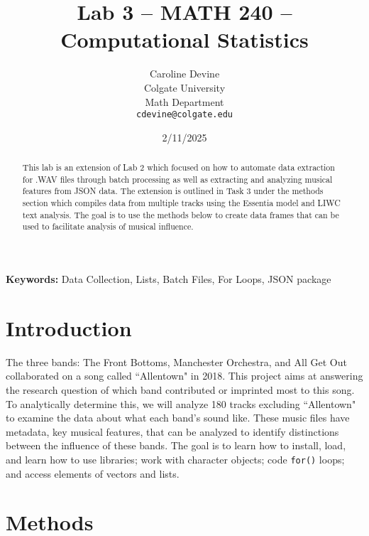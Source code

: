 \documentclass{article}\usepackage[]{graphicx}\usepackage[]{xcolor}
\begin{document}
\vspace{-1in}
\title{Lab 3 -- MATH 240 -- Computational Statistics}

\author{
  Caroline Devine \\
  Colgate University  \\
  Math Department  \\
  {\tt cdevine@colgate.edu}
}

\date{2/11/2025}

\maketitle

\begin{multicols}{2}
\begin{abstract}
This lab is an extension of Lab 2 which focused on how to automate data extraction for .WAV files through batch processing as well as extracting and analyzing musical features from JSON data. The extension is outlined in Task 3 under the methods section which compiles data from multiple tracks using the Essentia model and LIWC text analysis. The goal is to use the methods below to create data frames that can be used to facilitate analysis of musical influence.
\end{abstract}

\noindent \textbf{Keywords:} Data Collection, Lists, Batch Files, For Loops, JSON package

\section{Introduction}
The three bands: The Front Bottoms, Manchester Orchestra, and All Get Out collaborated on a song called ``Allentown"\citep{Ross} in 2018. This project aims at answering the research question of which band contributed or imprinted most to this song. To analytically determine this, we will analyze 180 tracks excluding ``Allentown" to examine the data about what each band's sound like. These music files have metadata, key musical features, that can be analyzed to identify distinctions between the influence of these bands. The goal is to learn how to install, load, and learn how to use libraries; work with character objects; code \texttt{for()} loops; and access elements of vectors and lists.

\section{Methods}


\end{multicols}
\end{document}
